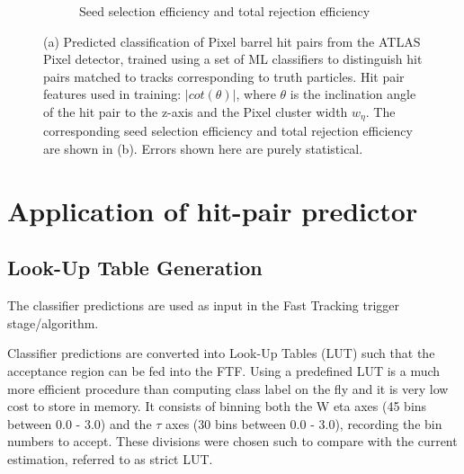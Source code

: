 \begin{figure}[!htbp]
\begin{subfigure}[b]{0.91\textwidth}
        \caption{Seed selection efficiency and total rejection efficiency}
    \end{subfigure}
\caption{(a) Predicted classification of Pixel barrel hit pairs from the ATLAS Pixel detector, trained using a set of ML classifiers to distinguish hit pairs matched to tracks corresponding to truth particles. Hit pair features used in training: $\lvert cot(\theta) \rvert$, where $\theta$ is the inclination angle of the hit pair to the z-axis and the Pixel cluster width $w_{\eta}$. The corresponding seed selection efficiency and total rejection efficiency are shown in (b). Errors shown here are purely statistical.}
\label{fig:predictions-pixel-barrel-and-triplet-efficiencies}
\end{figure}






\section{Application of hit-pair predictor}
\label{application-of-hit-pair-predictor}

\subsection{Look-Up Table Generation}

The classifier predictions are used as input in the Fast Tracking trigger stage/algorithm.

Classifier predictions are converted into Look-Up Tables (LUT) such that the acceptance region can be fed into the FTF. Using a predefined LUT is a much more efficient procedure than computing class label on the fly and it is very low cost to store in memory. It consists of binning both the W eta axes (45 bins between 0.0 - 3.0) and the $\tau$ axes (30 bins between 0.0 - 3.0), recording the bin numbers to accept. These divisions were chosen such to compare with the current estimation, referred to as strict LUT.

